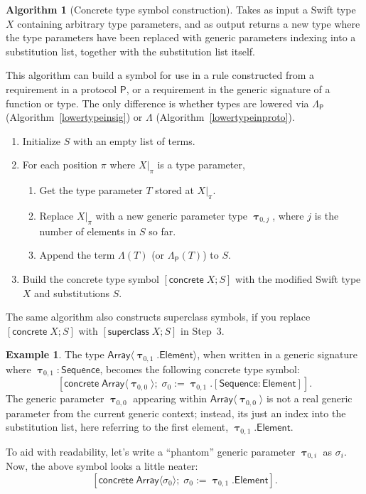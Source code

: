 \documentclass[a4paper,headsepline,bibliography=totoc,toc=flat,fleqn,twoside=semi]{scrbook}
\theoremstyle{definition}
\theoremstyle{definition}
\newtheorem{example}{Example}[chapter]
\theoremstyle{definition}
\newtheorem{algorithm}{Algorithm}[chapter]
\newcommand{\namesym}[1]{\mathsf{#1}}
\newcommand{\proto}[1]{\bm{\mathsf{#1}}}
\newcommand{\genericsym}[2]{\bm{\uptau}_{#1,#2}}
\newcommand{\assocsym}[2]{[\proto{#1}\colon\namesym{#2}]}
\newcommand{\supersym}[1]{[\mathsf{superclass}\;#1]}
\newcommand{\concretesym}[1]{[\mathsf{concrete}\;#1]}
\begin{document}
\begin{algorithm}[Concrete type symbol construction]\label{concretesymbolcons}
Takes as input a Swift type $X$ containing arbitrary type parameters, and as output returns a new type where the type parameters have been replaced with generic parameters indexing into a substitution list, together with the substitution list itself.

This algorithm can build a symbol for use in a rule constructed from a requirement in a protocol $\proto{P}$, or a requirement in the generic signature of a function or type. The only difference is whether types are lowered via $\Lambda_{\proto{P}}$ (Algorithm~\ref{lowertypeinsig}) or $\Lambda$ (Algorithm~\ref{lowertypeinproto}).
\begin{enumerate}
\item Initialize $S$ with an empty list of terms.
\item For each position $\pi$ where $X|_{\pi}$ is a type parameter,
\begin{enumerate}
\item Get the type parameter $T$ stored at $X|_{\pi}$.
\item Replace $X|_{\pi}$ with a new generic parameter type $\genericsym{0}{j}$, where $j$ is the number of elements in $S$ so far.
\item Append the term $\Lambda(T)$ (or $\Lambda_{\proto{P}}(T)$) to $S$.
\end{enumerate}
\item Build the concrete type symbol $\concretesym{X;S}$ with the modified Swift type $X$ and substitutions $S$.
\end{enumerate}
\end{algorithm}
The same algorithm also constructs superclass symbols, if you replace $\concretesym{X;S}$ with $\supersym{X;S}$ in Step~3.

\begin{example}
The type $\namesym{Array}\langle\genericsym{0}{1}.\namesym{Element}\rangle$, when written in a generic signature where $\genericsym{0}{1}\colon\proto{Sequence}$, becomes the following concrete type symbol:
\[\concretesym{\namesym{Array}\langle\genericsym{0}{0}\rangle;\;\sigma_0:=\genericsym{0}{1}.\assocsym{Sequence}{Element}}.\]
The generic parameter $\genericsym{0}{0}$ appearing within $\namesym{Array}\langle\genericsym{0}{0}\rangle$ is not a real generic parameter from the current generic context; instead, its just an index into the substitution list, here referring to the first element, $\genericsym{0}{1}.\namesym{Element}$.

To aid with readability, let's write a ``phantom'' generic parameter $\genericsym{0}{i}$ as $\sigma_i$. Now, the above symbol looks a little neater:
\[\concretesym{\namesym{Array}\langle\sigma_0\rangle;\;\sigma_0:=\genericsym{0}{1}.\namesym{Element}}.\]
\end{example}
\end{document}
